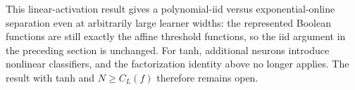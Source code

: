 This linear-activation result gives a polynomial-iid versus
exponential-online separation even at arbitrarily large learner widths:
the represented Boolean functions are still exactly the affine
threshold functions, so the iid argument in the preceding section is
unchanged. For tanh, additional neurons introduce nonlinear classifiers,
and the factorization identity above no longer applies. The result
with tanh and $N\ge C_L(f)$ therefore remains open.
